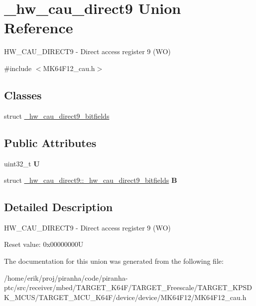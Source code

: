 \hypertarget{union__hw__cau__direct9}{}\section{\+\_\+hw\+\_\+cau\+\_\+direct9 Union Reference}
\label{union__hw__cau__direct9}


H\+W\+\_\+\+C\+A\+U\+\_\+\+D\+I\+R\+E\+C\+T9 -\/ Direct access register 9 (WO)  




{\ttfamily \#include $<$M\+K64\+F12\+\_\+cau.\+h$>$}

\subsection*{Classes}
\begin{DoxyCompactItemize}
\item 
struct \hyperlink{struct__hw__cau__direct9_1_1__hw__cau__direct9__bitfields}{\+\_\+hw\+\_\+cau\+\_\+direct9\+\_\+bitfields}
\end{DoxyCompactItemize}
\subsection*{Public Attributes}
\begin{DoxyCompactItemize}
\item 
uint32\+\_\+t {\bfseries U}\hypertarget{union__hw__cau__direct9_ae9d3edb3768d2a9174aed3406db08a0e}{}\label{union__hw__cau__direct9_ae9d3edb3768d2a9174aed3406db08a0e}

\item 
struct \hyperlink{struct__hw__cau__direct9_1_1__hw__cau__direct9__bitfields}{\+\_\+hw\+\_\+cau\+\_\+direct9\+::\+\_\+hw\+\_\+cau\+\_\+direct9\+\_\+bitfields} {\bfseries B}\hypertarget{union__hw__cau__direct9_a74b646d65a8e41e06689202917ad6a23}{}\label{union__hw__cau__direct9_a74b646d65a8e41e06689202917ad6a23}

\end{DoxyCompactItemize}


\subsection{Detailed Description}
H\+W\+\_\+\+C\+A\+U\+\_\+\+D\+I\+R\+E\+C\+T9 -\/ Direct access register 9 (WO) 

Reset value\+: 0x00000000U 

The documentation for this union was generated from the following file\+:\begin{DoxyCompactItemize}
\item 
/home/erik/proj/piranha/code/piranha-\/ptc/src/receiver/mbed/\+T\+A\+R\+G\+E\+T\+\_\+\+K64\+F/\+T\+A\+R\+G\+E\+T\+\_\+\+Freescale/\+T\+A\+R\+G\+E\+T\+\_\+\+K\+P\+S\+D\+K\+\_\+\+M\+C\+U\+S/\+T\+A\+R\+G\+E\+T\+\_\+\+M\+C\+U\+\_\+\+K64\+F/device/device/\+M\+K64\+F12/M\+K64\+F12\+\_\+cau.\+h\end{DoxyCompactItemize}
